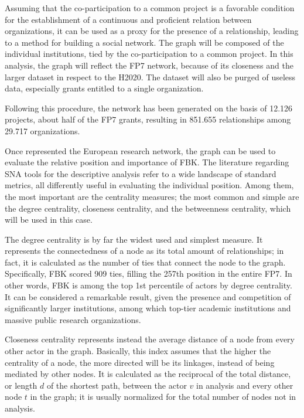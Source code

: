 Assuming that the co-participation to a common project is a favorable condition for the establishment of a continuous and proficient relation between organizations, it can be used as a proxy for the presence of a relationship, leading to a method for building a social network. The graph will be composed of the individual institutions, tied by the co-participation to a common project. In this analysis, the graph will reflect the FP7 network, because of its closeness and the larger dataset in respect to the H2020. The dataset will also be purged of useless data, especially grants entitled to a single organization. 

Following this procedure, the network has been generated on the basis of 12.126 projects, about half of the FP7 grants, resulting in 851.655 relationships among 29.717 organizations. 

Once represented the European research network, the graph can be used to evaluate the relative position and importance of FBK. The literature regarding SNA tools for the descriptive analysis refer to a wide landscape of standard metrics, all differently useful in evaluating the individual position. Among them, the most important are the centrality measures; the most common and simple are the degree centrality, closeness centrality, and the betweenness centrality, which will be used in this case.

The degree centrality is by far the widest used and simplest measure. It represents the connectedness of a node as its total amount of relationships; in fact, it is calculated as the number of ties that connect the node to the graph. Specifically, FBK scored 909 ties, filling the 257th position in the entire FP7. In other words, FBK is among the top 1st percentile of actors by degree centrality. It can be considered a remarkable result, given the presence and competition of significantly larger institutions, among which top-tier academic institutions and massive public research organizations. 

Closeness centrality represents instead the average distance of a node from every other actor in the graph. Basically, this index assumes that the higher the centrality of a node, the more directed will be its linkages, instead of being mediated by other nodes. It is calculated as the reciprocal of the total distance, or length $d$ of the shortest path, between the actor $v$ in analysis and every other node $t$ in the graph; it is usually normalized for the total number of nodes not in analysis. 

